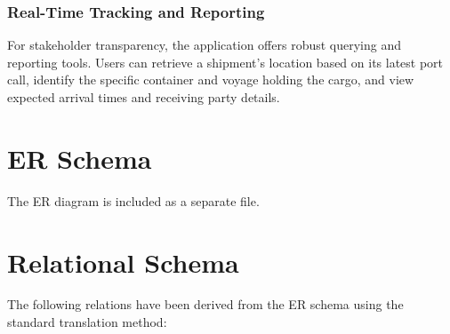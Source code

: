 \documentclass[11pt]{article}
\begin{document}
\subsubsection{Real-Time Tracking and Reporting}

For stakeholder transparency, the application offers robust querying and reporting tools. Users can retrieve a shipment's location based on its latest port call, identify the specific container and voyage holding the cargo, and view expected arrival times and receiving party details.

\section{ER Schema}


The ER diagram is included as a separate file.

\section{Relational Schema}

The following relations have been derived from the ER schema using the standard translation method:
\end{document}
